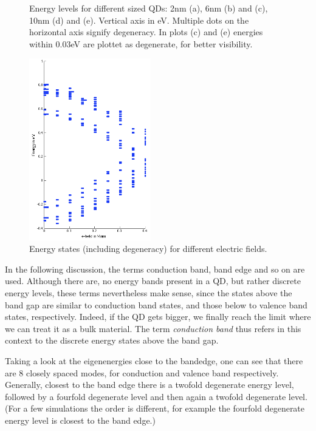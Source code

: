 \begin{figure}
\begin{subfigure}{60px}
		\caption{}
	\end{subfigure}
	\caption{Energy levels for different sized QDs: 2nm (a), 6nm (b) and (c), 10nm (d) and (e). Vertical axis in eV. Multiple dots on the horizontal axis signify degeneracy. In plots (c) and (e) energies within 0.03eV are plottet as degenerate, for better visibility.}
	\label{fig:e-levels}	
\end{figure}

\begin{figure}
	\centering
	\includegraphics[width=200px]{Fig/Plots/r25v.png}
	\caption{Energy states (including degeneracy) for different electric fields.}
	\label{fig:EvsVolt}
\end{figure}


\begin{REMARK}
In the following discussion, the terms conduction band, band edge and so on are used. Although there are, no energy bands present in a QD, but rather discrete energy levels, these terms nevertheless make sense, since the states above the band gap are similar to conduction band states, and those below to valence band states, respectively. Indeed, if the QD gets bigger, we finally reach the limit where we can treat it as a bulk material. The term \textit{conduction band} thus refers in this context to the discrete energy states above the band gap.
\end{REMARK}
	
Taking a look at the eigenenergies close to the bandedge, one can see that there are 8 closely spaced modes, for conduction and valence band respectively. Generally, closest to the band edge there is a twofold degenerate energy level, followed by a fourfold degenerate level and then again a twofold degenerate level. (For a few simulations the order is different, for example the fourfold degenerate energy level is closest to the band edge.)
	
